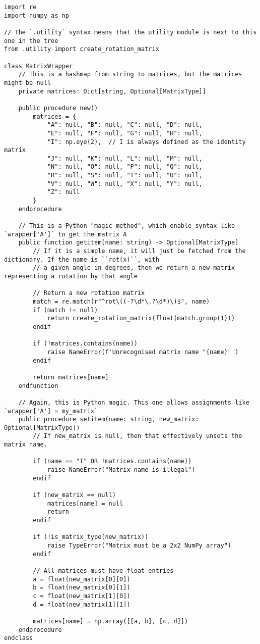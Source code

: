\documentclass[../main.tex]{subfiles}
\begin{document}
\begin{verbatim}
import re
import numpy as np

// The `.utility` syntax means that the utility module is next to this one in the tree
from .utility import create_rotation_matrix

class MatrixWrapper
	// This is a hashmap from string to matrices, but the matrices might be null
	private matrices: Dict[string, Optional[MatrixType]]

	public procedure new()
		matrices = {
			"A": null, "B": null, "C": null, "D": null,
			"E": null, "F": null, "G": null, "H": null,
			"I": np.eye(2),  // I is always defined as the identity matrix
			"J": null, "K": null, "L": null, "M": null,
			"N": null, "O": null, "P": null, "Q": null,
			"R": null, "S": null, "T": null, "U": null,
			"V": null, "W": null, "X": null, "Y": null,
			"Z": null
		}
	endprocedure

	// This is a Python "magic method", which enable syntax like `wrapper['A']` to get the matrix A
	public function getitem(name: string) -> Optional[MatrixType]
		// If it is a simple name, it will just be fetched from the dictionary. If the name is ``rot(x)``, with
		// a given angle in degrees, then we return a new matrix representing a rotation by that angle

		// Return a new rotation matrix
		match = re.match(r"^rot\((-?\d*\.?\d*)\)$", name)
		if (match != null)
			return create_rotation_matrix(float(match.group(1)))
		endif

		if (!matrices.contains(name))
			raise NameError(f'Unrecognised matrix name "{name}"')
		endif

		return matrices[name]
	endfunction

	// Again, this is Python magic. This one allows assignments like `wrapper['A'] = my_matrix`
	public procedure setitem(name: string, new_matrix: Optional[MatrixType])
		// If new_matrix is null, then that effectively unsets the matrix name.

		if (name == "I" OR !matrices.contains(name))
			raise NameError("Matrix name is illegal")
		endif

		if (new_matrix == null)
			matrices[name] = null
			return
		endif

		if (!is_matrix_type(new_matrix))
			raise TypeError("Matrix must be a 2x2 NumPy array")
		endif

		// All matrices must have float entries
		a = float(new_matrix[0][0])
		b = float(new_matrix[0][1])
		c = float(new_matrix[1][0])
		d = float(new_matrix[1][1])

		matrices[name] = np.array([[a, b], [c, d]])
	endprocedure
endclass
\end{verbatim}
\end{document}
